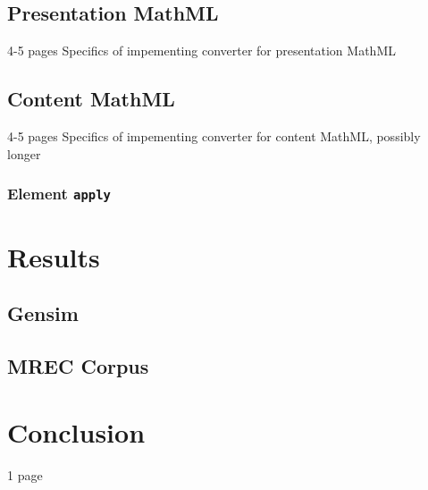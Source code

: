 \documentclass[11pt,oneside,final]{fithesis2}
\begin{document}
\section{Presentation MathML}
4-5 pages Specifics of impementing converter for presentation MathML
\section{Content MathML}
4-5 pages Specifics of impementing converter for content MathML, possibly longer
\subsection{Element \texttt{apply}}

\chapter{Results}
\section{Gensim}
\section{MREC Corpus}

\chapter{Conclusion}
1 page
\end{document}
